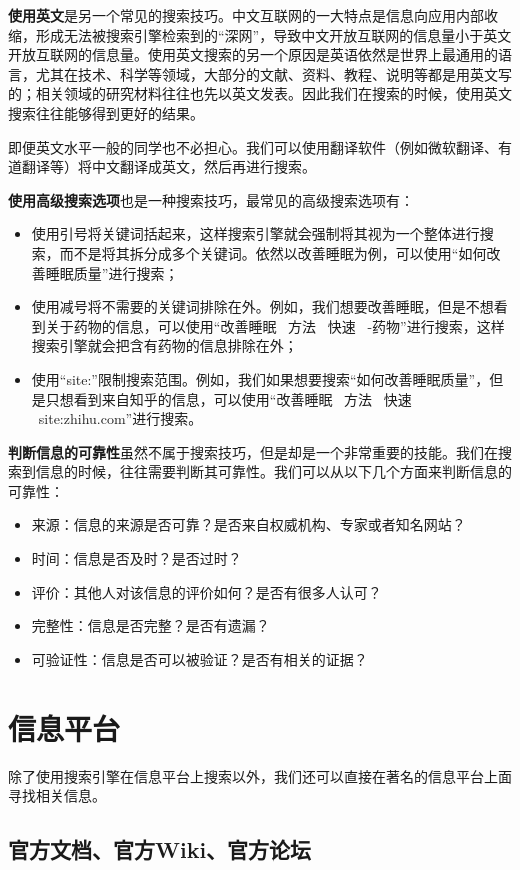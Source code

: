 \documentclass[../main.tex]{subfiles}
\begin{document}
\textbf{使用英文}是另一个常见的搜索技巧。中文互联网的一大特点是信息向应用内部收缩，形成无法被搜索引擎检索到的“深网”，导致中文开放互联网的信息量小于英文开放互联网的信息量。使用英文搜索的另一个原因是英语依然是世界上最通用的语言，尤其在技术、科学等领域，大部分的文献、资料、教程、说明等都是用英文写的；相关领域的研究材料往往也先以英文发表。因此我们在搜索的时候，使用英文搜索往往能够得到更好的结果。

即便英文水平一般的同学也不必担心。我们可以使用翻译软件（例如微软翻译、有道翻译等）将中文翻译成英文，然后再进行搜索。

\textbf{使用高级搜索选项}也是一种搜索技巧，最常见的高级搜索选项有：
\begin{itemize}
    \item 使用引号将关键词括起来，这样搜索引擎就会强制将其视为一个整体进行搜索，而不是将其拆分成多个关键词。依然以改善睡眠为例，可以使用“如何改善睡眠质量”进行搜索；
    \item 使用减号将不需要的关键词排除在外。例如，我们想要改善睡眠，但是不想看到关于药物的信息，可以使用“改善睡眠 \ 方法 \ 快速 \ -药物”进行搜索，这样搜索引擎就会把含有药物的信息排除在外；
    \item 使用“site:”限制搜索范围。例如，我们如果想要搜索“如何改善睡眠质量”，但是只想看到来自知乎的信息，可以使用“改善睡眠 \ 方法 \ 快速 \ site:zhihu.com”进行搜索。
\end{itemize}

\textbf{判断信息的可靠性}虽然不属于搜索技巧，但是却是一个非常重要的技能。我们在搜索到信息的时候，往往需要判断其可靠性。我们可以从以下几个方面来判断信息的可靠性：
\begin{itemize}
    \item 来源：信息的来源是否可靠？是否来自权威机构、专家或者知名网站？
    \item 时间：信息是否及时？是否过时？
    \item 评价：其他人对该信息的评价如何？是否有很多人认可？
    \item 完整性：信息是否完整？是否有遗漏？
    \item 可验证性：信息是否可以被验证？是否有相关的证据？
\end{itemize}

\section{信息平台}

除了使用搜索引擎在信息平台上搜索以外，我们还可以直接在著名的信息平台上面寻找相关信息。

\subsection{官方文档、官方Wiki、官方论坛}
\end{document}
